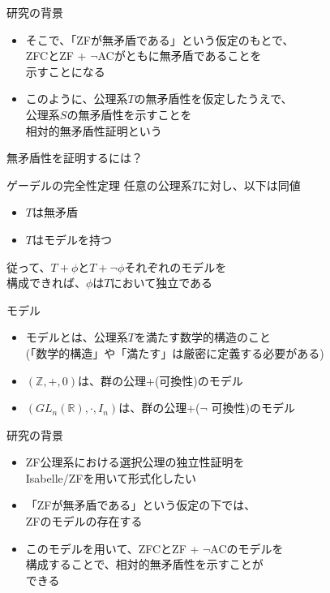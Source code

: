 \documentclass[17pt,aspectratio=169,xcolor=dvipsnames,table,dvipdfmx]{beamer}
\theoremstyle{definition}
\begin{document}
\begin{frame} {研究の背景}
    \begin{itemize}
        \item そこで、「ZFが無矛盾である」という仮定のもとで、\\ZFCとZF + $\neg$ACがともに無矛盾であることを\\示すことになる
        \item このように、公理系$T$の無矛盾性を仮定したうえで、\\公理系$S$の無矛盾性を示すことを\\相対的無矛盾性証明という
    \end{itemize}
\end{frame}

\begin{frame} {無矛盾性を証明するには？}
    \begin{exampleblock}{ゲーデルの完全性定理}
        任意の公理系$T$に対し、以下は同値
        \begin{itemize}
            \item $T$は無矛盾
            \item $T$はモデルを持つ
        \end{itemize}
    \end{exampleblock}
    従って、$T + \phi$と$T + \neg \phi$それぞれのモデルを\\構成できれば、$\phi$は$T$において独立である
\end{frame}

\begin{frame} {モデル}
    \begin{itemize}
        \item モデルとは、公理系$T$を満たす数学的構造のこと \\ {\footnotesize (「数学的構造」や「満たす」は厳密に定義する必要がある)}
        \item $(\mathbb{Z}, +, 0)$は、群の公理+(可換性)のモデル
        \item $(GL_n(\mathbb{R}), \cdot, I_n)$は、群の公理+($\neg$ 可換性)のモデル
    \end{itemize}
\end{frame}

\begin{frame} {研究の背景}
    \begin{itemize}
        \item ZF公理系における選択公理の独立性証明を\\Isabelle/ZFを用いて形式化したい
        \item 「ZFが無矛盾である」という仮定の下では、\\ZFのモデルの存在する
        \item このモデルを用いて、ZFCとZF + $\neg$ACのモデルを\\構成することで、相対的無矛盾性を示すことが\\できる
    \end{itemize}
\end{frame}
\end{document}
